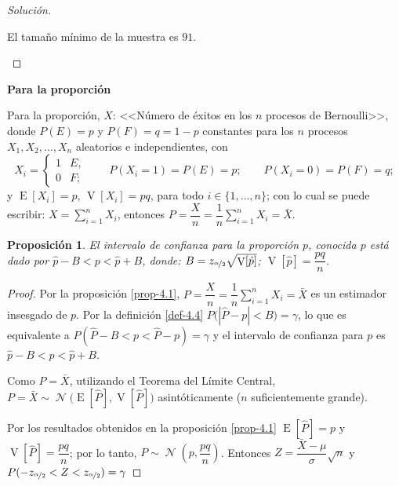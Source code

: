 \documentclass[a5paper,doc,10pt,noapacite]{apa6}
\newcommand{\dsum}{\displaystyle \sum}
\DeclareMathOperator{\Esp}{E}
\DeclareMathOperator{\Var}{V}
\DeclareMathOperator{\Normal}{\mathcal{N}}
\newtheorem{proposicion}{Proposición}
\newcommand{\neodefi}[1]{%
	\vspace{1\baselineskip}
	\textbf{\small#1} \newline
}
\begin{document}
{{\begin{proof}[Solución]
\begin{APAenumerate}
	El tamaño mínimo de la muestra es \(91\).			\qedhere
	\end{APAenumerate}
\end{proof}



\neodefi{Para la proporción}

Para la proporción, \(X\): <<Número de éxitos en los \(n\) procesos de Bernoulli>>, donde \(P(E)=p\) y \(P(F)=q=1-p\) constantes para los \(n\) procesos \(X_1,X_2,\ldots,X_n\) aleatorios e independientes, con 
\[
	X_i=\begin{cases} 1 & E,\\ 0 & F;\end{cases}
	\qquad
	P(X_i=1)=P(E)=p;
	\qquad
	P(X_i=0)=P(F)=q;
\]
y \(\Esp[X_i]=p\), \(\Var[X_i]=pq\), para todo \(i \in \{1,\ldots,n\}\); con lo cual se puede escribir: \( X=\displaystyle\sum_{i=1}^{n}X_i\), entonces \(P=\dfrac{X}{n}=\dfrac{1}{n}\dsum_{i=1}^{n}X_i=\bar{X}\).

\begin{proposicion}
	El intervalo de confianza para la proporción \(p\), conocida \(p\) está dado por \(\hat{p}-B<p<\hat{p}+B\), donde: \(B=z_{\nicefrac{\alpha}{2}}\sqrt{\Var[\hat{p}]}\); \(\Var[\hat{p}]=\dfrac{pq}{n}\).
\end{proposicion}
\begin{proof}
	Por la proposición \eqref{prop-4.1}, \(P=\dfrac{X}{n}=\dfrac{1}{n}\displaystyle\sum_{i=1}^{n}X_i=\bar{X}\) es un estimador insesgado de \(p\). Por la definición \eqref{def-4.4} \(P\big(\left|\hat{P}-p\right|<B\big)=\gamma\), lo que es equivalente a  \(P(\hat{P}-B<p<\hat{P}-p)=\gamma\) y el intervalo de confianza para  \(p\) es \(\hat{p}-B<p<\hat{p}+B\).
	
	Como \(P=\bar{X}\), utilizando el Teorema del Límite Central, \(P=\bar{X}\sim\Normal\big(\Esp[\hat{P}],\Var[\hat{P}]\big)\) asintóticamente (\(n\) suficientemente grande).
	
	Por los resultados obtenidos en la proposición \eqref{prop-4.1} \(\Esp[\hat{P}]=p\) y \(\Var[\hat{P}]=\dfrac{pq}{n}\); por lo tanto, \(P\sim\Normal\left(p,\dfrac{pq}{n}\right)\). Entonces \(Z=\dfrac{\bar{X}-\mu}{\sigma}\sqrt{n}\) y \(P(-z_{\nicefrac{\alpha}{2}}<Z<z_{\nicefrac{\alpha}{2}})=\gamma\)
	

\end{proof}}}
\end{document}

